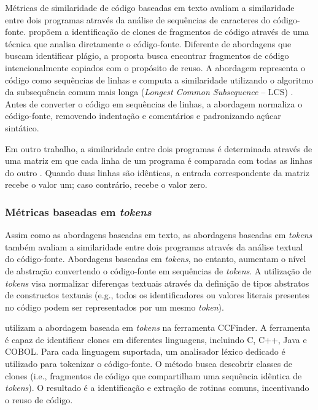 Métricas de similaridade de código baseadas em texto avaliam a similaridade entre dois programas através da análise de sequências de caracteres do código-fonte.  propõem a identificação de clones de fragmentos de código através de uma técnica que analisa diretamente o código-fonte. Diferente de abordagens que buscam identificar plágio, a proposta busca encontrar fragmentos de código intencionalmente copiados com o propósito de reuso. A abordagem representa o código como sequências de linhas e computa a similaridade utilizando o algoritmo da subsequência comum mais longa (\textit{Longest Common Subsequence} -- LCS) \cite{hirschberg:1977}. Antes de converter o código em sequências de linhas, a abordagem normaliza o código-fonte, removendo indentação e comentários e padronizando açúcar sintático.

Em outro trabalho, a similaridade entre dois programas é determinada através de uma matriz em que cada linha de um programa é comparada com todas as linhas do outro \cite{ducasse:etal:1999}. Quando duas linhas são idênticas, a entrada correspondente da matriz recebe o valor um; caso contrário, recebe o valor zero.

\subsubsection{Métricas baseadas em \textit{tokens}}

Assim como as abordagens baseadas em texto, as abordagens baseadas em \textit{tokens} também avaliam a similaridade entre dois programas através da análise textual do código-fonte. Abordagens baseadas em \textit{tokens}, no entanto, aumentam o nível de abstração convertendo o código-fonte em sequências de \textit{tokens}. A utilização de \textit{tokens} visa normalizar diferenças textuais através da definição de tipos abstratos de constructos textuais (e.g., todos os identificadores ou valores literais presentes no código podem ser representados por um mesmo \textit{token}).

 utilizam a abordagem baseada em \textit{tokens} na ferramenta CCFinder. A ferramenta é capaz de identificar clones em diferentes linguagens, incluindo C, C++, Java e COBOL. Para cada linguagem suportada, um analisador léxico dedicado é utilizado para tokenizar o código-fonte. O método busca descobrir classes de clones (i.e., fragmentos de código que compartilham uma sequência idêntica de \textit{tokens}). O resultado é a identificação e extração de rotinas comuns, incentivando o reuso de código.

